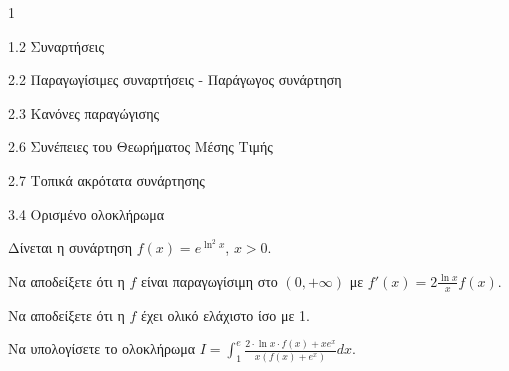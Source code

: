 \begin{ylh}{1}
    \item 1.2 Συναρτήσεις
    \item 2.2 Παραγωγίσιμες συναρτήσεις - Παράγωγος συνάρτηση
    \item 2.3 Κανόνες παραγώγισης
    \item 2.6 Συνέπειες του Θεωρήματος Μέσης Τιμής
    \item 2.7 Τοπικά ακρότατα συνάρτησης
    \item 3.4 Ορισμένο ολοκλήρωμα
\end{ylh}
Δίνεται η συνάρτηση $f(x) = e^{\ln^2 x}$, $x > 0$.
\begin{alist}
\item Να αποδείξετε ότι η $f$ είναι παραγωγίσιμη στο $(0, +\infty)$ με $f'(x) = 2 \frac{\ln x}{x} f(x)$. 
\item Να αποδείξετε ότι η $f$ έχει ολικό ελάχιστο ίσο με 1. 
\item Να υπολογίσετε το ολοκλήρωμα $I = \int_1^e \frac{2 \cdot \ln x \cdot f(x) + x e^x}{x(f(x)+e^x)} dx$. 
\end{alist}